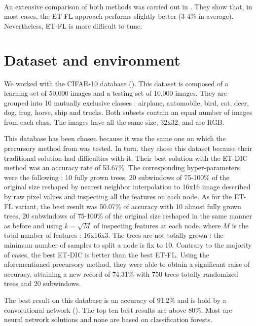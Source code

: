\documentclass[a4paper]{report}
\begin{document}
		\paragraph{}
		An extensive comparison of both methods was carried out in \cite{}. They show that, in most cases, the ET-FL approach performs slightly better (3-4\% in average). Nevertheless, ET-FL is more difficult to tune. 
			
	\section{Dataset and environment} %
	We worked with the CIFAR-10 database (\cite{cifar}). This dataset is composed of a learning set of 50,000 images and a testing set of 10,000 images. They are grouped into 10 mutually exclusive classes : airplane, automobile, bird, cat, deer, dog, frog, horse, ship and trucks. Both subsets contain an equal number of images from each class. The images have all the same size, 32x32, and are RGB.
	\par
	This database has been chosen because it was the same one on which the precursory method from \cite{} was tested. In turn, they chose this dataset because their traditional solution had difficulties with it. Their best solution with the ET-DIC method was an accuracy rate of 53.67\%. The corresponding hyper-parameters were the following : 10 fully grown trees, 20 subwindows of 75-100\% of the original size reshaped by nearest neighbor interpolation to 16x16 image described by raw pixel values and inspecting all the features on each node. As for the ET-FL variant, the best result was 50.07\% of accuracy with 10 almost fully grown trees, 20 subwindows of 75-100\% of the original size reshaped in the same manner as before and using $k = \sqrt{M}$ of inspecting features at each node, where $M$ is the total number of features : 16x16x3. The trees are not totally grown : the minimum number of samples to split a node is fix to 10. Contrary to the majority of cases, the best ET-DIC is better than the best ET-FL.
	Using the aforementioned precursory method, they were able to obtain a significant raise of accuracy, attaining a new record of 74.31\% with 750 trees totally randomized trees and 20 subwindows.
	\par
	The best result on this database is an accuracy of 91.2\% and is hold by a convolutional network (\cite{bestcifar}). The top ten best results are above 80\%. Most are neural network solutions and none are based on classification forests.
\end{document}
